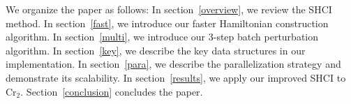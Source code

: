 \documentclass[%
reprint,
 superscriptaddress,
 amsmath,amssymb,
 aps,
]{revtex4-1}
\begin{document}

We organize the paper as follows:
In section~\ref{overview}, we review the SHCI method.
In section~\ref{fast}, we introduce our faster Hamiltonian construction algorithm.
In section~\ref{multi}, we introduce our 3-step batch perturbation algorithm.
In section~\ref{key}, we describe the key data structures in our implementation.
In section~\ref{para}, we describe the parallelization strategy and demonstrate its scalability.
In section~\ref{results}, we apply our improved SHCI to Cr$_2$.
Section~\ref{conclusion} concludes the paper.



\end{document}
